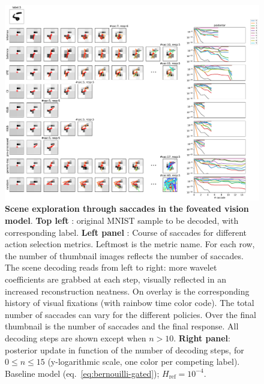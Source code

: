 \documentclass[12pt,twoside,openright]{article}
\begin{document}
\begin{figure}[t!]
	\includegraphics[width=\linewidth]{img/frontiers_trajectories_0.pdf}

	\caption{\textbf{Scene exploration through saccades in the foveated vision model}.\textbf{ Top left} : original MNIST sample to be decoded, with corresponding label. \textbf{Left panel} : Course of saccades for different action selection metrics. Leftmost is the metric name. For each row, the number of thumbnail images reflects the number of saccades.  The scene decoding reads from left to right: more wavelet coefficients are grabbed at each step, visually reflected in an increased reconstruction neatness. On overlay is the corresponding history of visual fixations (with rainbow time color code). The total number of saccades can vary for the different policies. Over the final thumbnail is the number of saccades and the final response. All decoding steps are shown except when $n>10$. \textbf{Right panel}: posterior update in function of the number of decoding steps, for $0 \leq n \leq 15$ (y-logarithmic scale, one color per competing label). Baseline model (eq.~\ref{eq:bernouilli-gated}); $H_\text{ref} = 10^{-4}$. }\label{fig:foveated-saccades}

\end{figure}
\end{document}
